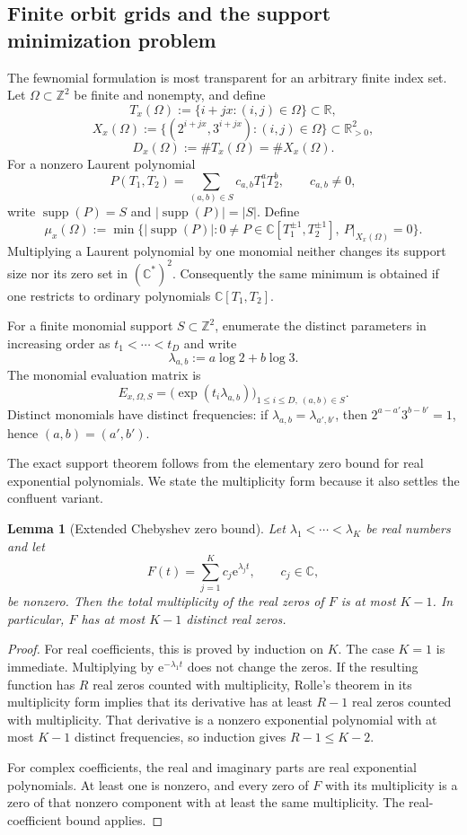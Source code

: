 \documentclass[11pt,oneside]{article}
\newtheorem{lemma}[theorem]{Lemma}
\theoremstyle{definition}
\theoremstyle{remark}
\newcommand{\Z}{\mathbb Z}
\newcommand{\R}{\mathbb R}
\newcommand{\C}{\mathbb C}
\newcommand{\supp}{\operatorname{supp}}
\newcommand{\ee}{\mathrm e}
\begin{document}
\subsection{Finite orbit grids and the support minimization problem}
\label{sec:sparse-grid}

The fewnomial formulation is most transparent for an arbitrary finite index set.  Let
$\Omega\subset\Z^2$ be finite and nonempty, and define
\[
  T_x(\Omega):=\{i+jx:(i,j)\in\Omega\}\subset\R,
\]
\[
  X_x(\Omega):=
  \{(2^{i+jx},3^{i+jx}):(i,j)\in\Omega\}\subset\R_{>0}^2,
\]
\[
  D_x(\Omega):=\#T_x(\Omega)=\#X_x(\Omega).
\]
For a nonzero Laurent polynomial
\[
  P(T_1,T_2)=\sum_{(a,b)\in S}c_{a,b}T_1^aT_2^b,
  \qquad c_{a,b}\ne0,
\]
write $\supp(P)=S$ and $|\supp(P)|=|S|$.  Define
\[
  \mu_x(\Omega):=
  \min\bigl\{|\supp(P)|:
     0\ne P\in\C[T_1^{\pm1},T_2^{\pm1}],\ 
     P|_{X_x(\Omega)}=0\bigr\}.
\]
Multiplying a Laurent polynomial by one monomial neither changes its support size nor its
zero set in $(\C^*)^2$.  Consequently the same minimum is obtained if one restricts to
ordinary polynomials $\C[T_1,T_2]$.

For a finite monomial support $S\subset\Z^2$, enumerate the distinct parameters in increasing
order as $t_1<\cdots<t_D$ and write
\[
  \lambda_{a,b}:=a\log2+b\log3.
\]
The monomial evaluation matrix is
\[
  E_{x,\Omega,S}
   =\bigl(\exp(t_i\lambda_{a,b})\bigr)_
      {1\le i\le D,\ (a,b)\in S}.
\]
Distinct monomials have distinct frequencies: if
$\lambda_{a,b}=\lambda_{a',b'}$, then
$2^{a-a'}3^{b-b'}=1$, hence $(a,b)=(a',b')$.

The exact support theorem follows from the elementary zero bound for real exponential
polynomials.  We state the multiplicity form because it also settles the confluent variant.

\begin{lemma}[Extended Chebyshev zero bound]
\label{lem:exp-zero-bound}
Let $\lambda_1<\cdots<\lambda_K$ be real numbers and let
\[
  F(t)=\sum_{j=1}^K c_j\ee^{\lambda_jt},
  \qquad c_j\in\C,
\]
be nonzero.  Then the total multiplicity of the real zeros of $F$ is at most $K-1$.  In
particular, $F$ has at most $K-1$ distinct real zeros.
\end{lemma}

\begin{proof}
For real coefficients, this is proved by induction on $K$.  The case $K=1$ is immediate.
Multiplying by $\ee^{-\lambda_1t}$ does not change the zeros.  If the resulting function has
$R$ real zeros counted with multiplicity, Rolle's theorem in its multiplicity form implies
that its derivative has at least $R-1$ real zeros counted with multiplicity.  That derivative
is a nonzero exponential polynomial with at most $K-1$ distinct frequencies, so induction
gives $R-1\le K-2$.

For complex coefficients, the real and imaginary parts are real exponential polynomials.  At
least one is nonzero, and every zero of $F$ with its multiplicity is a zero of that nonzero
component with at least the same multiplicity.  The real-coefficient bound applies.
\end{proof}
\end{document}

